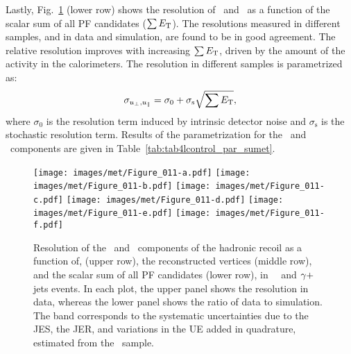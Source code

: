 Lastly, Fig.~\ref{fig:resolution_sumet} (lower row) shows the resolution of \upar\ and \uperp\ as a function of the scalar \pt sum of all PF candidates ($\sum E_{\mathrm{T}}$). 
The resolutions measured in different samples, and in data and simulation, are found to be in good agreement. 
The relative \ptmiss resolution improves with increasing $\sum E_{\mathrm{T}}$, driven by the amount of the activity in the calorimeters. The resolution in different samples is parametrized as:
\begin{equation}
\sigma_{u_\perp, u_\Vert} = \sigma_{0} + \sigma_{\text{s}}\sqrt{\sum{\ensuremath{E_{\mathrm{T}}}}},
\end{equation}
where $\sigma_{\mathrm{0}}$ is the resolution term induced by intrinsic detector noise and $\sigma_{\mathrm{s}}$ is the stochastic resolution term. 
Results of the parametrization for the \upar\ and \uperp\ components are given in Table~\ref{tab:tab4lcontrol_par_sumet}. 
\begin{figure}[h!p]
  \centering
   \texttt{[image: images/met/Figure\_011-a.pdf]}
   \texttt{[image: images/met/Figure\_011-b.pdf]}
   \texttt{[image: images/met/Figure\_011-c.pdf]}
   \texttt{[image: images/met/Figure\_011-d.pdf]}
   \texttt{[image: images/met/Figure\_011-e.pdf]}
   \texttt{[image: images/met/Figure\_011-f.pdf]}
  \caption{Resolution of the \upar\ and \uperp\ components of the hadronic recoil as a function of, \qt (upper row), the reconstructed vertices (middle row), and the scalar \pt sum of all PF candidates (lower row), in \Zmm\, \Zee\, and $\gamma+$jets events. In each plot, the upper panel shows the resolution in data, whereas the lower panel shows the ratio of data to simulation. The band corresponds to the systematic uncertainties due to the JES, the JER, and variations in the UE added in quadrature, estimated from the \Zee\ sample. }
  \label{fig:resolution_sumet}
\end{figure}

